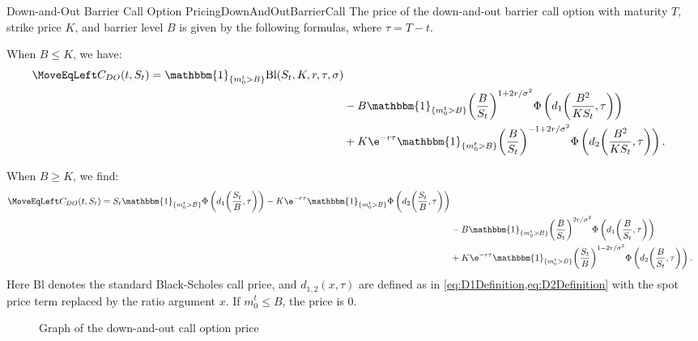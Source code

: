 \begin{prop}{Down-and-Out Barrier Call Option Pricing}{DownAndOutBarrierCall}
	The price of the down-and-out barrier call option with maturity \(T\), strike price \(K\), and barrier level \(B\) is given by the following formulas, where \(\tau = T-t\).

	When \(B \le K\), we have:
	\begin{align}
		\MoveEqLeft C_{DO}(t, S_t) = \mathbbm{1}_{\{m_0^t > B\}} \mathrm{Bl}(S_t, K, r, \tau, \sigma) \nonumber                                                      \\
		 & - B \mathbbm{1}_{\{m_0^t > B\}} {\left( \frac{B}{S_t} \right)}^{1+2r/\sigma^2} \Phi \left( d_1 {\left( \frac{B^2}{K S_t}, \tau \right)} \right) \nonumber     \\
		 & + K \e^{-r\tau} \mathbbm{1}_{\{m_0^t > B\}} {\left( \frac{B}{S_t} \right)}^{-1+2r/\sigma^2} \Phi \left( d_2 {\left( \frac{B^2}{K S_t}, \tau \right)} \right).
	\end{align}

	When \(B \ge K\), we find:
	\begin{align}
		\MoveEqLeft C_{DO}(t, S_t) = S_t \mathbbm{1}_{\{m_0^t > B\}} \Phi \left( d_1 {\left( \frac{S_t}{B}, \tau \right)} \right) - K \e^{-r\tau} \mathbbm{1}_{\{m_0^t > B\}} \Phi \left( d_2 {\left( \frac{S_t}{B}, \tau \right)} \right) \nonumber \\
		 & - B \mathbbm{1}_{\{m_0^t > B\}} {\left( \frac{B}{S_t} \right)}^{2r/\sigma^2} \Phi \left( d_1 {\left( \frac{B}{S_t}, \tau \right)} \right) \nonumber                                                                                       \\
		 & + K \e^{-r\tau} \mathbbm{1}_{\{m_0^t > B\}} {\left( \frac{S_t}{B} \right)}^{1-2r/\sigma^2} \Phi \left( d_2 {\left( \frac{B}{S_t}, \tau \right)} \right).
	\end{align}
	Here \(\mathrm{Bl}\) denotes the standard Black-Scholes call price, and \(d_{1,2}(x, \tau)\) are defined as in \cref{eq:D1Definition,eq:D2Definition} with the spot price term replaced by the ratio argument \(x\). If \(m_0^t \le B\), the price is \(0\).
\end{prop}


\begin{figure}[H]
	\centering
	
	\caption{Graph of the down-and-out call option price}\label{fig:downAndOutCallBarrierSurface}
\end{figure}

\clearpage
